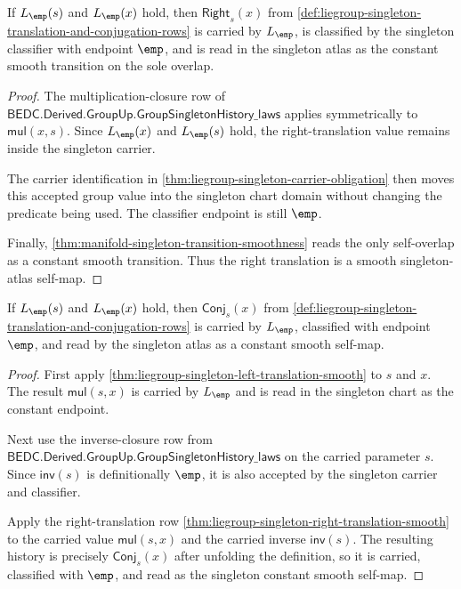 \begin{theorem}
\label{thm:liegroup-singleton-right-translation-smooth}
If $L_{\emp}(s)$ and $L_{\emp}(x)$ hold, then
$\mathsf{Right}_s(x)$ from
\autoref{def:liegroup-singleton-translation-and-conjugation-rows} is carried by
$L_{\emp}$, is classified by the singleton classifier with endpoint $\emp$, and
is read in the singleton atlas as the constant smooth transition on the sole
overlap.
\end{theorem}
\begin{proof}
The multiplication-closure row of
$\mathsf{BEDC.Derived.GroupUp.GroupSingletonHistory\_laws}$ applies symmetrically
to $\mathsf{mul}(x,s)$. Since $L_{\emp}(x)$ and $L_{\emp}(s)$ hold, the
right-translation value remains inside the singleton carrier.

The carrier identification in
\autoref{thm:liegroup-singleton-carrier-obligation} then moves this accepted
group value into the singleton chart domain without changing the predicate being
used. The classifier endpoint is still $\emp$.

Finally, \autoref{thm:manifold-singleton-transition-smoothness} reads the only
self-overlap as a constant smooth transition. Thus the right translation is a
smooth singleton-atlas self-map.
\end{proof}

\begin{theorem}
\label{thm:liegroup-singleton-conjugation-smooth}
If $L_{\emp}(s)$ and $L_{\emp}(x)$ hold, then
$\mathsf{Conj}_s(x)$ from
\autoref{def:liegroup-singleton-translation-and-conjugation-rows} is carried by
$L_{\emp}$, classified with endpoint $\emp$, and read by the singleton atlas as a
constant smooth self-map.
\end{theorem}
\begin{proof}
First apply
\autoref{thm:liegroup-singleton-left-translation-smooth} to $s$ and $x$. The
result $\mathsf{mul}(s,x)$ is carried by $L_{\emp}$ and is read in the singleton
chart as the constant endpoint.

Next use the inverse-closure row from
$\mathsf{BEDC.Derived.GroupUp.GroupSingletonHistory\_laws}$ on the carried
parameter $s$. Since $\mathsf{inv}(s)$ is definitionally $\emp$, it is also
accepted by the singleton carrier and classifier.

Apply the right-translation row
\autoref{thm:liegroup-singleton-right-translation-smooth} to the carried value
$\mathsf{mul}(s,x)$ and the carried inverse $\mathsf{inv}(s)$. The resulting
history is precisely $\mathsf{Conj}_s(x)$ after unfolding the definition, so it
is carried, classified with $\emp$, and read as the singleton constant smooth
self-map.
\end{proof}

